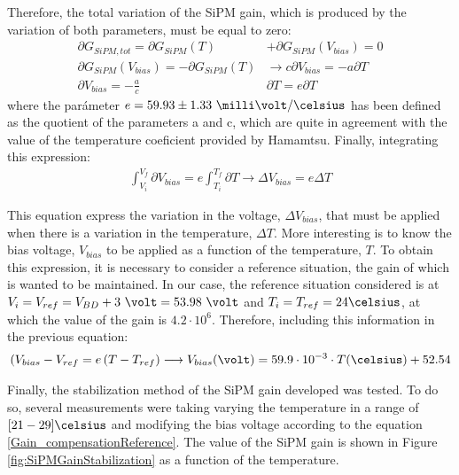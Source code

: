 Therefore, the total variation of the SiPM gain, which is produced by the variation of both parameters, must be equal to zero:
\begin{equation*}
\begin{split}
\partial G_{SiPM, tot}= \partial G_{SiPM}(T) &+ \partial G_{SiPM}(V_{bias}) = 0\\ 
\partial G_{SiPM}(V_{bias}) = -\partial G_{SiPM}(T) &\longrightarrow c \partial V_{bias} = - a \partial T\\ 
\partial V_{bias}  = - \frac{a}{c}&\partial T = e \partial T
\label{Gain_compensation0}
\end{split}
\end{equation*} 
where the parámeter $e= 59.93 \pm 1.33~\milli\volt/\celsius $ has been defined as the quotient of the parameters a and c, which are quite in agreement with the value of the temperature coeficient provided by Hamamtsu. Finally, integrating this expression:
\begin{equation*}
\begin{split}
\int_{V_i}^{V_f}\partial V_{bias}  = e\int_{T_i}^{T_f}\partial T \longrightarrow \Delta V_{bias} = e \Delta T
\label{Gain_compensationIntegring}
\end{split}
\end{equation*} 

This equation express the variation in the voltage, $\Delta V_{bias}$, that must be applied when there is a variation in the temperature, $\Delta T$. More interesting is to know the bias voltage, $V_{bias}$ to be applied as a function of the temperature, $T$. To obtain this expression, it is necessary to consider a reference situation, the gain of which is wanted to be maintained. In our case, the reference situation considered is at $V_i=V_{ref}= V_{BD}+3~\volt = 53.98~\volt$ and $T_i=T_{ref}=24\celsius$, at which the value of the gain is $4.2 \cdot{} 10^{6}$. Therefore, including this information in the previous equation:
\begin{equation*}
\begin{split}
(V_{bias}-V_{ref} = e \left( T -T_{ref} \right) \longrightarrow V_{bias}(\volt)= 59.9 \cdot{} 10^{-3} \cdot{} T(\celsius) + 52.54
\label{Gain_compensationReference}
\end{split}
\end{equation*} 

Finally, the stabilization method of the SiPM gain developed was tested. To do so, several measurements were taking varying the temperature in a range of $[21-29]\celsius$ and modifying the bias voltage according to the equation \ref{Gain_compensationReference}. The value of the SiPM gain is shown in Figure \ref{fig:SiPMGainStabilization} as a function of the temperature.

